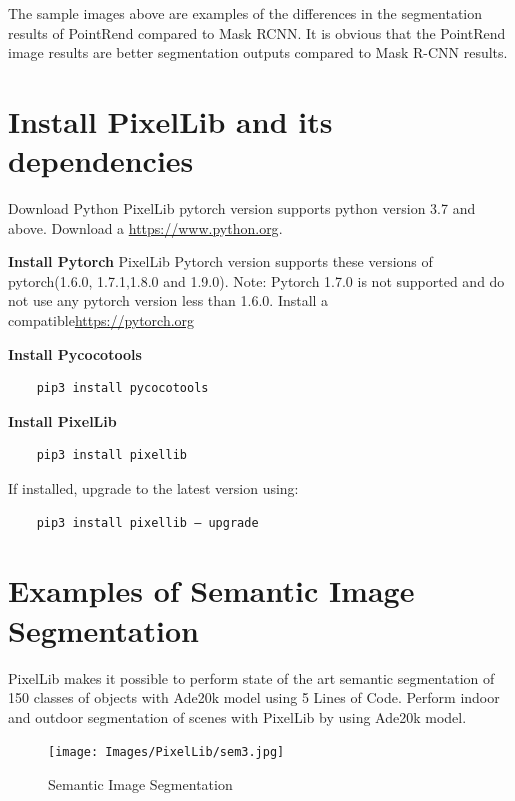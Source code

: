 The sample images above are examples of the differences in the segmentation results of PointRend compared to Mask RCNN. It is obvious that the PointRend image results are better segmentation outputs compared to Mask R-CNN results.

\section{Install PixelLib and its dependencies}

Download Python
PixelLib pytorch version supports python version 3.7 and above. Download a \url{https://www.python.org}.\newline


\textbf{Install Pytorch}\newline
PixelLib Pytorch version supports these versions of pytorch(1.6.0, 1.7.1,1.8.0 and 1.9.0).
Note: Pytorch 1.7.0 is not supported and do not use any pytorch version less than 1.6.0. Install a compatible\url{https://pytorch.org}

\textbf{Install Pycocotools}
\begin{verbatim}
    pip3 install pycocotools
\end{verbatim}

\textbf{Install PixelLib}
\begin{verbatim}
    pip3 install pixellib
\end{verbatim}	

If installed, upgrade to the latest version using:
\begin{verbatim}
    pip3 install pixellib — upgrade
\end{verbatim}		

\section{Examples of Semantic Image Segmentation}
PixelLib makes it possible to perform state of the art semantic segmentation of 150 classes of objects with Ade20k model using 5 Lines of Code. Perform indoor and outdoor segmentation of scenes with PixelLib by using Ade20k model.
\begin{figure}[h!]
    \centering
    \texttt{[image: Images/PixelLib/sem3.jpg]} %
    
    \caption{Semantic Image Segmentation}
    \label{fig:your_image_label}
    
    
\end{figure}



